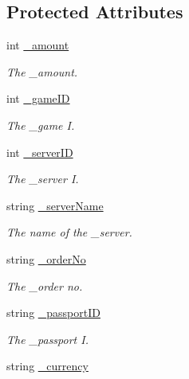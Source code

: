 \subsection*{Protected Attributes}
\begin{DoxyCompactItemize}
\item 
int \mbox{\hyperlink{class_t_net_1_1_contract_1_1_action_1_1_pay_normal_action_a29b7948f9ac6fdb6d237a2192b925633}{\+\_\+amount}}
\begin{DoxyCompactList}\small\item\em The \+\_\+amount. \end{DoxyCompactList}\item 
int \mbox{\hyperlink{class_t_net_1_1_contract_1_1_action_1_1_pay_normal_action_a00149028964f4b42a8f6044595a2b064}{\+\_\+game\+ID}}
\begin{DoxyCompactList}\small\item\em The \+\_\+game I. \end{DoxyCompactList}\item 
int \mbox{\hyperlink{class_t_net_1_1_contract_1_1_action_1_1_pay_normal_action_a1a55110772f8eecace222fa69b5d0f40}{\+\_\+server\+ID}}
\begin{DoxyCompactList}\small\item\em The \+\_\+server I. \end{DoxyCompactList}\item 
string \mbox{\hyperlink{class_t_net_1_1_contract_1_1_action_1_1_pay_normal_action_ad60a98eb4f4b95d9788fe37178b50686}{\+\_\+server\+Name}}
\begin{DoxyCompactList}\small\item\em The name of the \+\_\+server. \end{DoxyCompactList}\item 
string \mbox{\hyperlink{class_t_net_1_1_contract_1_1_action_1_1_pay_normal_action_afc6d0ff45058d1ed0add2e370cca1548}{\+\_\+order\+No}}
\begin{DoxyCompactList}\small\item\em The \+\_\+order no. \end{DoxyCompactList}\item 
string \mbox{\hyperlink{class_t_net_1_1_contract_1_1_action_1_1_pay_normal_action_a178544f470a13d730c6857b42003eeb8}{\+\_\+passport\+ID}}
\begin{DoxyCompactList}\small\item\em The \+\_\+passport I. \end{DoxyCompactList}\item 
string \mbox{\hyperlink{class_t_net_1_1_contract_1_1_action_1_1_pay_normal_action_a2ac03a002bb5231c8b9bbc449fddcac7}{\+\_\+currency}}

\end{DoxyCompactItemize}
